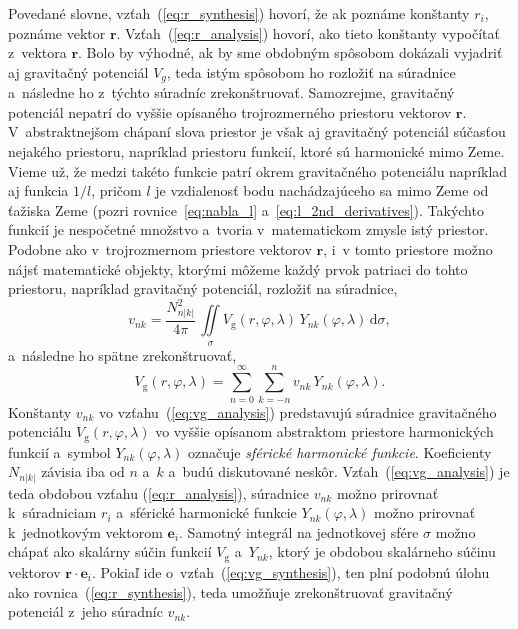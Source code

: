 \documentclass[a4paper,12pt]{book}
\newcommand{\diff}{\mathrm d}
\newcommand{\gidx}{\mathrm g}
\let\vec\mathbf
\begin{document}
Povedané slovne, vzťah~(\ref{eq:r_synthesis}) hovorí, že ak poznáme konštanty
$r_i$, poznáme vektor $\vec r$.  Vzťah~(\ref{eq:r_analysis}) hovorí, ako tieto
konštanty vypočítať z~vektora $\vec r$.  Bolo by výhodné, ak by sme obdobným
spôsobom dokázali vyjadriť aj gravitačný potenciál $V_g$, teda istým spôsobom
ho rozložiť na súradnice a~následne ho z~týchto súradníc zrekonštruovať.
Samozrejme, gravitačný potenciál nepatrí do vyššie opísaného trojrozmerného
priestoru vektorov $\vec r$.  V~abstraktnejšom chápaní slova priestor je však
aj gravitačný potenciál súčasťou nejakého priestoru, napríklad priestoru
funkcií, ktoré sú harmonické mimo Zeme.  Vieme už, že medzi takéto funkcie
patrí okrem gravitačného potenciálu napríklad aj funkcia $1 \slash l$, pričom
$l$ je vzdialenosť bodu nachádzajúceho sa mimo Zeme od ťažiska Zeme (pozri
rovnice~\ref{eq:nabla_l} a~\ref{eq:l_2nd_derivatives}).  Takýchto funkcií je
nespočetné množstvo a~tvoria v~matematickom zmysle istý priestor.  Podobne ako
v~trojrozmernom priestore vektorov $\vec r$, i~v tomto priestore možno nájsť
matematické objekty, ktorými môžeme každý prvok patriaci do tohto priestoru,
napríklad gravitačný potenciál, rozložiť na súradnice,
%
\begin{equation}
\label{eq:vg_analysis}
v_{nk} = \frac{N^2_{n|k|}}{4\pi} \, \iint\limits_{\sigma} V_\gidx(r, \varphi, 
\lambda) \, Y_{nk}(\varphi, \lambda) \, \diff \sigma{,}
\end{equation}
%
a~následne ho spätne zrekonštruovať,
%
\begin{equation}
\label{eq:vg_synthesis}
V_\gidx(r, \varphi, \lambda) = \sum_{n = 0}^{\infty} \sum_{k = -n}^{n} v_{nk}
\, Y_{nk}(\varphi, \lambda){.}
\end{equation}
%
Konštanty $v_{nk}$ vo vzťahu~(\ref{eq:vg_analysis}) predstavujú súradnice
gravitačného potenciálu $V_\gidx(r, \varphi, \lambda)$ vo vyššie opísanom
abstraktom priestore harmonických funkcií a~symbol $Y_{nk}(\varphi, \lambda)$
označuje \emph{sférické harmonické funkcie}.  Koeficienty $N_{n|k|}$ závisia
iba od $n$ a~$k$ a~budú diskutované neskôr.  Vzťah~(\ref{eq:vg_analysis}) je
teda obdobou vzťahu (\ref{eq:r_analysis}), súradnice $v_{nk}$ možno prirovnať
k~súradniciam $r_i$ a~sférické harmonické funkcie $Y_{nk}(\varphi, \lambda)$
možno prirovnať k~jednotkovým vektorom $\vec e_i$.  Samotný integrál na
jednotkovej sfére $\sigma$ možno chápať ako skalárny súčin funkcií $V_\gidx$
a~$Y_{nk}$, ktorý je obdobou skalárneho súčinu vektorov $\vec r \cdot \vec
e_i$.  Pokiaľ ide o~vzťah~(\ref{eq:vg_synthesis}), ten plní podobnú úlohu ako
rovnica~(\ref{eq:r_synthesis}), teda umožňuje zrekonštruovať gravitačný
potenciál z~jeho súradníc $v_{nk}$.
\end{document}
